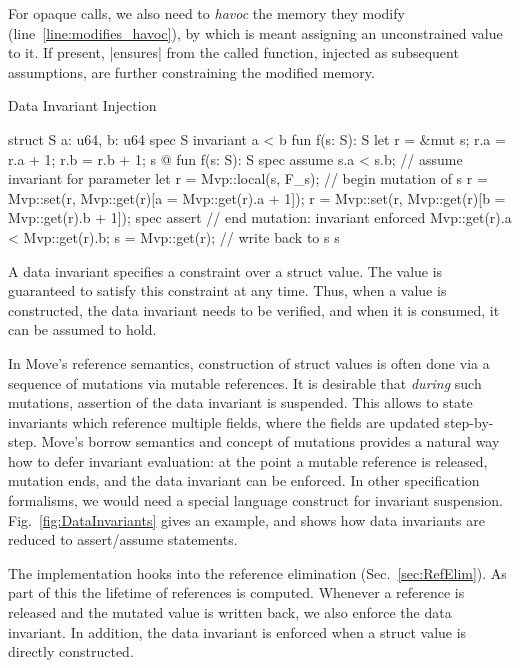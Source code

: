 For opaque calls, we also need to \emph{havoc} the memory they modify
(line~\ref{line:modifies_havoc}), by which is meant assigning an unconstrained
value to it. If present, |ensures| from the called function, injected as
subsequent assumptions, are further constraining the modified memory.



\begin{Figure}
  \caption{Data Invariant Injection}
  \label{fig:DataInvariants}
  \centering
\begin{MoveBox}
  struct S { a: u64, b: u64 }
  spec S { invariant a < b }
  fun f(s: S): S { let r = &mut s; r.a = r.a + 1; r.b = r.b + 1; s }
  @\transform@
  fun f(s: S): S {
    spec assume s.a < s.b;      // assume invariant for parameter
    let r = Mvp::local(s, F_s); // begin mutation of s
    r = Mvp::set(r, Mvp::get(r)[a = Mvp::get(r).a + 1]);
    r = Mvp::set(r, Mvp::get(r)[b = Mvp::get(r).b + 1]);
    spec assert                 // end mutation: invariant enforced
      Mvp::get(r).a < Mvp::get(r).b;
    s = Mvp::get(r);            // write back to s
    s
  }
\end{MoveBox}
\end{Figure}

A data invariant specifies a constraint over a struct value. The value is
guaranteed to satisfy this constraint at any time. Thus, when a value is
constructed, the data invariant needs to be verified, and when it is consumed,
it can be assumed to hold.

In Move's reference semantics, construction of struct values is often done via a
sequence of mutations via mutable references. It is desirable that \emph{during}
such mutations, assertion of the data invariant is suspended. This allows to
state invariants which reference multiple fields, where the fields are updated
step-by-step.  Move's borrow semantics and concept of mutations provides a
natural way how to defer invariant evaluation: at the point a mutable reference
is released, mutation ends, and the data invariant can be enforced.  In other
specification formalisms, we would need a special language construct for
invariant suspension. Fig.~\ref{fig:DataInvariants} gives an example, and shows
how data invariants are reduced to assert/assume statements.


The implementation hooks into the reference elimination
(Sec.~\ref{sec:RefElim}). As part of this the lifetime of references is
computed. Whenever a reference is released and the mutated value is written
back, we also enforce the data invariant. In addition, the data invariant is
enforced when a struct value is directly constructed.



